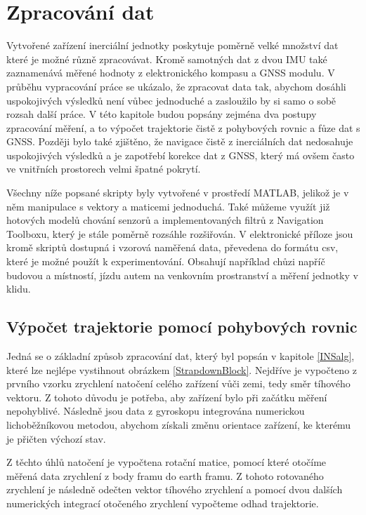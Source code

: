 \chapter{Zpracování dat}
Vytvořené zařízení inerciální jednotky poskytuje poměrně velké množství dat které je možné různě zpracovávat. Kromě samotných dat z dvou IMU také zaznamenává měřené hodnoty z elektronického kompasu a GNSS modulu. V průběhu vypracování práce se ukázalo, že zpracovat data tak, abychom dosáhli uspokojivých výsledků není vůbec jednoduché a zasloužilo by si samo o sobě rozsah další práce. V této kapitole budou popsány zejména dva postupy zpracování měření, a to výpočet trajektorie čistě z pohybových rovnic a fůze dat s GNSS. Později bylo také zjištěno, že navigace čistě z inerciálních dat nedosahuje uspokojivých výsledků a je zapotřebí korekce dat z GNSS, který má ovšem často ve vnitřních prostorech velmi špatné pokrytí.

Všechny níže popsané skripty byly vytvořené v prostředí MATLAB, jelikož je v něm manipulace s vektory a maticemi jednoduchá. Také můžeme využít již hotových modelů chování senzorů a implementovaných filtrů z Navigation Toolboxu, který je stále poměrně rozsáhle rozšiřován. V elektronické příloze jsou kromě skriptů dostupná i vzorová naměřená data, převedena do formátu csv, které je možné použít k experimentování. Obsahují například chůzi napříč budovou a místností, jízdu autem na venkovním prostranství a měření jednotky v klidu.

\section{Výpočet trajektorie pomocí pohybových rovnic} \label{noFiltProcessing}
Jedná se o základní způsob zpracování dat, který byl popsán v kapitole \ref{INSalg}, které lze nejlépe vystihnout obrázkem  \ref{StrapdownBlock}. Nejdříve je vypočteno z prvního vzorku zrychlení natočení celého zařízení vůči zemi, tedy směr tíhového vektoru. Z tohoto důvodu je potřeba, aby zařízení bylo při začátku měření nepohyblivé. Následně jsou data z gyroskopu integrována numerickou lichoběžníkovou metodou, abychom získali změnu orientace zařízení, ke kterému je přičten výchozí stav.

Z těchto úhlů natočení je vypočtena rotační matice, pomocí které otočíme měřená data zrychlení z body framu do earth framu. Z tohoto rotovaného zrychlení je následně odečten vektor tíhového zrychlení a pomocí dvou dalších numerických integrací otočeného zrychlení vypočteme odhad trajektorie.


